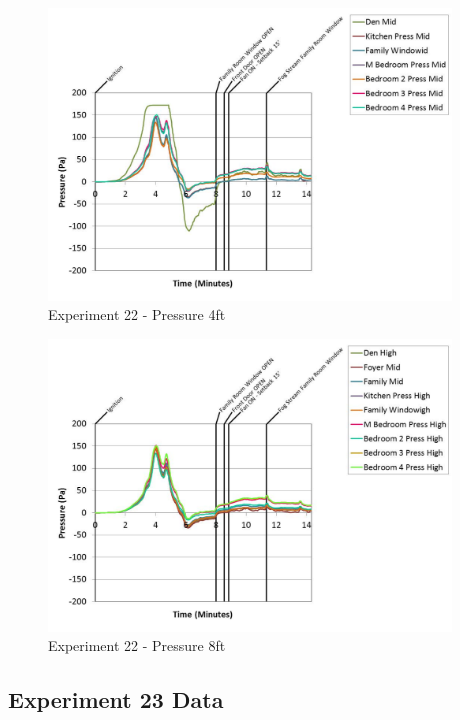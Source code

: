 \documentclass{article}
\begin{document}
\begin{appendices}
	\clearpage

	\begin{figure}[h!]
		\centering
		\includegraphics[height=3.05in]{0_Images/Results_Charts/Exp_22_Charts/Pressure4ft.pdf}
		\caption{Experiment 22 - Pressure 4ft}
	\end{figure}
 

	\begin{figure}[h!]
		\centering
		\includegraphics[height=3.05in]{0_Images/Results_Charts/Exp_22_Charts/Pressure8ft.pdf}
		\caption{Experiment 22 - Pressure 8ft}
	\end{figure}
 
	\clearpage

		\clearpage
\clearpage		\large
\subsection{Experiment 23 Data} \label{App:Exp23Results} 


\end{appendices}
\end{document}
